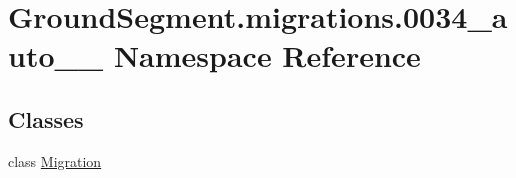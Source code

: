 \hypertarget{namespace_ground_segment_1_1migrations_1_10034__auto__20170130__1320}{}\section{Ground\+Segment.\+migrations.0034\+\_\+auto\+\_\+\_ Namespace Reference}
\label{namespace_ground_segment_1_1migrations_1_10034__auto__20170130__1320}
\subsection*{Classes}
\begin{DoxyCompactItemize}
\item 
class \hyperlink{class_ground_segment_1_1migrations_1_10034__auto__20170130__1320_1_1_migration}{Migration}
\end{DoxyCompactItemize}

